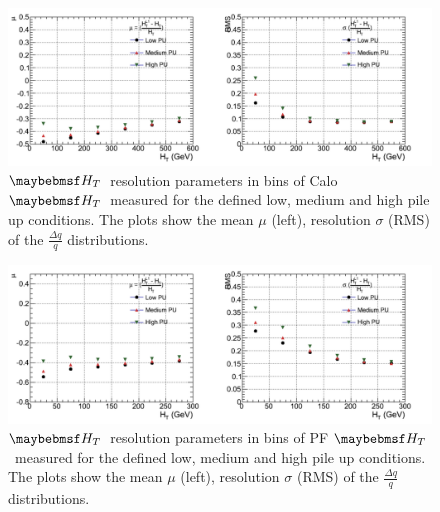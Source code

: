 \begin{figure}[h!]
  \vspace{20pt}
        \centering
        \includegraphics[width=1.0\textwidth]{plots/res_CaloHT_summary.pdf}
        \caption[$\theht$~resolution parameters in bins of Calo $\theht$~measured for the defined low, medium and high pile up conditions. ]{$\theht$~resolution parameters in bins of Calo $\theht$~measured for the defined low, medium and high pile up conditions. The plots show the mean $\mu$ (left), resolution $\sigma$ (RMS) of the $\frac{\Delta q}{q}$ distributions.}
        \label{fig:calohtresultspu}
\end{figure}
\begin{figure}[h!]
  \vspace{20pt}
        \centering
        \includegraphics[width=1.0\textwidth]{plots/res_pfHT_summary.pdf}
        \caption[$\theht$~resolution parameters in bins of PF $\theht$~measured for the defined low, medium and high pile up conditions.]{$\theht$~resolution parameters in bins of PF $\theht$~measured for the defined low, medium and high pile up conditions. The plots show the mean $\mu$ (left), resolution $\sigma$ (RMS) of the $\frac{\Delta q}{q}$ distributions.}
        \label{fig:pfhtresultspu}
\end{figure}

